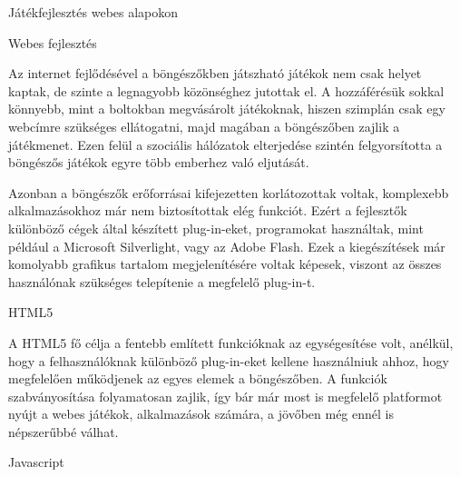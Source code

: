 \begin{MyChapter}{Játékfejlesztés webes alapokon}	

	\begin{MySection}{Webes fejlesztés}
		
		Az internet fejlődésével a böngészőkben játszható játékok nem csak helyet kaptak, de szinte a legnagyobb közönséghez jutottak el. A hozzáférésük sokkal könnyebb, mint a boltokban megvásárolt játékoknak, hiszen szimplán csak egy webcímre szükséges ellátogatni, majd magában a böngészőben zajlik a játékmenet. Ezen felül a szociális hálózatok elterjedése szintén felgyorsította a böngészős játékok egyre több emberhez való eljutását.
		
		Azonban a böngészők erőforrásai kifejezetten korlátozottak voltak, komplexebb alkalmazásokhoz már nem biztosítottak elég funkciót. Ezért a fejlesztők különböző cégek által készített plug-in-eket, programokat használtak, mint például a Microsoft Silverlight, vagy az Adobe Flash. Ezek a kiegészítések már komolyabb grafikus tartalom megjelenítésére voltak képesek, viszont az összes használónak szükséges telepítenie a megfelelő plug-in-t.  
		

	\end{MySection}

	\begin{MySection}{HTML5}
		
		A HTML5 fő célja a fentebb említett funkcióknak az egységesítése volt, anélkül, hogy a felhasználóknak különböző plug-in-eket kellene használniuk ahhoz, hogy megfelelően működjenek az egyes elemek a böngészőben. A funkciók szabványosítása folyamatosan zajlik, így bár már most is megfelelő platformot nyújt a webes játékok, alkalmazások számára, a jövőben még ennél is népszerűbbé válhat.
		
	\end{MySection}

	\begin{MySection}{Javascript}
	\end{MySection}


\end{MyChapter}
